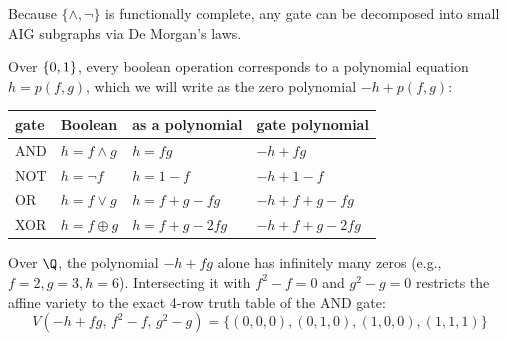 \documentclass[a4paper, 11pt]{report}
\begin{document}
\begin{center}
\end{center}

Because $\{\wedge, \neg\}$ is functionally complete, any gate can be decomposed into small AIG subgraphs via De Morgan's laws.

Over $\set{0,1}$, every boolean operation corresponds to a polynomial equation $h = p(f, g)$, which we will write as the zero polynomial $-h + p(f,g)$:

\begin{center}
\begin{tabular}{llll}
\toprule
gate & Boolean & as a polynomial & gate polynomial \\
\midrule
AND & $h = f \wedge g$ & $h = fg$ & $-h + fg$ \\
NOT & $h = \neg f$ & $h = 1 - f$ & $-h + 1 - f$ \\
OR & $h = f \vee g$ & $h = f + g - fg$ & $-h + f + g - fg$ \\
XOR & $h = f \oplus g$ & $h = f + g - 2fg$ & $-h + f + g - 2fg$ \\
\bottomrule
\end{tabular}
\end{center}

Over $\Q$, the polynomial $-h + fg$ alone has infinitely many zeros (e.g., $f=2, g=3, h=6$). Intersecting it with $f^2 - f = 0$ and $g^2 - g = 0$ restricts the affine variety to the exact 4-row truth table of the AND gate:
$$V(-h + fg,\, f^2 - f,\, g^2 - g) = \{(0,0,0), (0,1,0), (1,0,0), (1,1,1)\}$$
\end{document}
